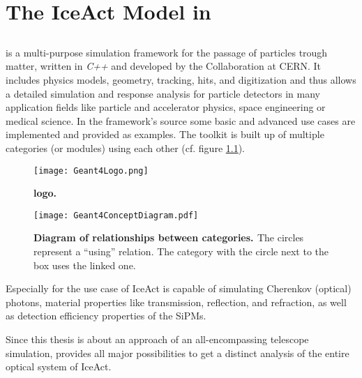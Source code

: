 \chapter{The IceAct Model in \geant}

\section{\geant}
\geant is a multi-purpose simulation framework for the passage of particles trough matter, written in \textit{C++} and developed by the \geant Collaboration at CERN. It includes physics models, geometry, tracking, hits, and digitization and thus allows a detailed simulation and response analysis for particle detectors in many application fields like particle and accelerator physics, space engineering or medical science. In the framework's source some basic and advanced use cases are implemented and provided as examples. The toolkit is built up of multiple categories (or modules) using each other (cf. figure \ref{geant4:categories}). \cite{geant4}

\begin{wrapfigure}{r}{0.5\textwidth}
	\centering
	\texttt{[image: Geant4Logo.png]}
	\caption[\geant Logo]{\textbf{\geant logo.} \cite{geant4:logo}}	
\end{wrapfigure}

\begin{figure}[h]
	\centering
	\texttt{[image: Geant4ConceptDiagram.pdf]}
	\caption[\geant category diagram]{\textbf{Diagram of relationships between \geant categories. \cite{geant4}} The circles represent a \enquote{using} relation. The category with the circle next to the box uses the linked one.}	
	\label{geant4:categories}
\end{figure}

Especially for the use case of IceAct \geant is capable of simulating Cherenkov (optical) photons, material properties like transmission, reflection, and refraction, as well as detection efficiency properties of the SiPMs.

Since this thesis is about an approach of an all-encompassing telescope simulation, \geant provides all major possibilities to get a distinct analysis of the entire optical system of IceAct.

